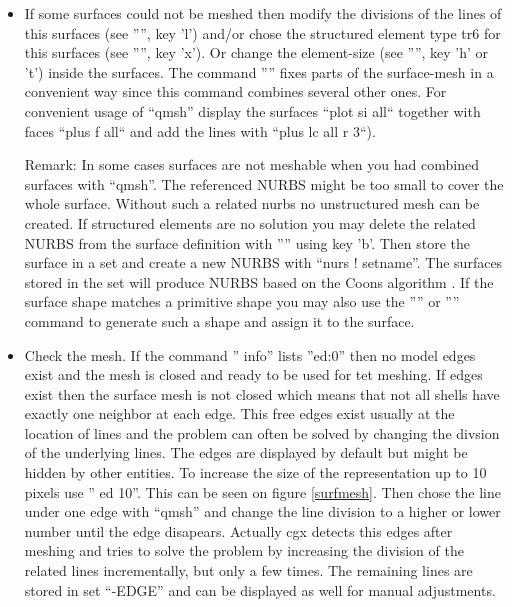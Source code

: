 \documentclass{article}
\begin{document}
\begin{appendix}
\begin{itemize}
\item If some surfaces could not be meshed then modify the divisions of the lines of this surfaces (see '''', key 'l') and/or chose the structured element type tr6 for this surfaces (see '''', key 'x'). Or change the element-size (see '''', key 'h' or 't') inside the surfaces. The command '''' fixes parts of the surface-mesh in a convenient way since this command combines several other ones. For convenient usage of ``qmsh'' display the surfaces ``plot si all`` together with faces ``plus f all`` and add the lines with ``plus lc all r 3``).

Remark: In some cases surfaces are not meshable when you had combined surfaces with ``qmsh''. The referenced NURBS might be too small to cover the whole surface. Without such a related nurbs no unstructured mesh can be created. If structured elements are no solution you may delete the related NURBS from the surface definition with '''' using key 'b'. Then store the surface in a set and create a new NURBS with ``nurs ! setname''. The surfaces stored in the set will produce NURBS based on the Coons algorithm \cite{Coons}. If the surface shape matches a primitive shape you may also use the '''' or '''' command to generate such a shape and assign it to the surface.     

\item Check the mesh. If the command '' info'' lists ''ed:0'' then no model edges exist and the mesh is closed and ready to be used for tet meshing. If edges exist then the surface mesh is not closed which means that not all shells have exactly one neighbor at each edge. This free edges exist usually at the location of lines and the problem can often be solved by changing the divsion of the underlying lines. The edges are displayed by default but might be hidden by other entities. To increase the size of the representation up to 10 pixels use '' ed 10''. This can be seen on figure \ref{surfmesh}. Then chose the line under one edge with ``qmsh'' and change the line division to a higher or lower number until the edge disapears. Actually cgx detects this edges after meshing and tries to solve the problem by increasing the division of the related lines incrementally, but only a few times. The remaining lines are stored in set ``-EDGE'' and can be displayed as well for manual adjustments. 
  

\end{itemize}
\end{appendix}
\end{document}
